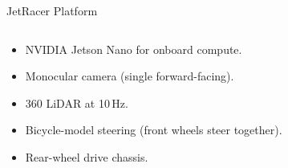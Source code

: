 \documentclass[aspectratio=169,12pt]{beamer}
\begin{document}
\begin{frame}[t]{JetRacer Platform}
  \vspace*{-0.3em}
  \begin{columns}[T]
    \begin{column}{0.55\textwidth}
      \begin{itemize}\setlength{\itemsep}{0.35em}
        \item NVIDIA Jetson Nano for onboard compute.
        \item Monocular camera (single forward-facing).
        \item 360\textdegree{} LiDAR at 10\,Hz.
        \item Bicycle-model steering (front wheels steer together).
        \item Rear-wheel drive chassis.
      \end{itemize}
    \end{column}
    \begin{column}{0.45\textwidth}
      \centering

    \end{column}
  \end{columns}
\end{frame}
\end{document}
